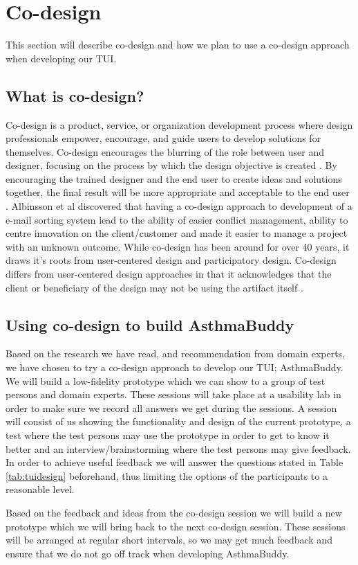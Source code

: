 \section{Co-design}
\label{sec:codesign}
This section will describe co-design and how we plan to use a co-design approach when developing our TUI.

\subsection{What is co-design?}
Co-design is a product, service, or organization development process where design professionals empower, encourage, and guide users to develop solutions for themselves. Co-design encourages the blurring of the role between user and designer, focusing on the process by which the design objective is created \cite{sanders2008co}. By encouraging the trained designer and the end user to create ideas and solutions together, the final result will be more appropriate and acceptable to the end user \cite{albinsson2007co}. 
Albinsson et al \cite{albinsson2007co} discovered that having a co-design approach to development of a e-mail sorting system lead to the ability of easier conflict management, ability to centre innovation on the client/customer and made it easier to manage a project with an unknown outcome. While co-design has been around for over 40 years, it draws it's roots from user-centered design and participatory design. Co-design differs from user-centered design approaches in that it acknowledges that the client or beneficiary of the design may not be using the artifact itself \cite{norman1986user}.



\subsection{Using co-design to build AsthmaBuddy}
Based on the research we have read, and recommendation from domain experts, we have chosen to try a co-design approach to develop our TUI; AsthmaBuddy. We will build a low-fidelity prototype which we can show to a group of test persons and domain experts. These sessions will take place at a usability lab in order to make sure we record all answers we get during the sessions. A session will consist of us showing the functionality and design of the current prototype, a test where the test persons may use the prototype in order to get to know it better and an interview/brainstorming where the test persons may give feedback. In order to achieve useful feedback we will answer the questions stated in Table \ref{tab:tuidesign} beforehand, thus limiting the options of the participants to a reasonable level. 


Based on the feedback and ideas from the co-design session we will build a new prototype which we will bring back to the next co-design session. These sessions will be arranged at regular short intervals, so we may get much feedback and ensure that we do not go off track when developing AsthmaBuddy.
